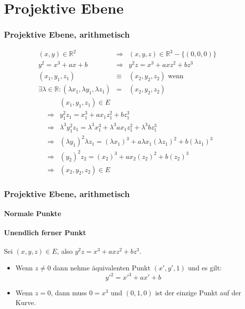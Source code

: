 \documentclass{beamer}
\begin{document}
\section{Projektive Ebene}
\begin{frame}
  \frametitle{Projektive Ebene, arithmetisch}
  \begin{eqnarray*}
    (x,y) \in \mathbb{R}^2
    & \Rightarrow & (x, y, z) \in \mathbb{R}^3 - \{(0,0,0)\} \\
    y^2 = x^3 + ax + b
    & \Rightarrow & y^2z = x^3 + axz^2 + bz^3 \\
    (x_1, y_1, z_1) &\equiv &(x_2, y_2, z_2) \text{ wenn } \\
    \exists \lambda \in \mathbb{R}:
    (\lambda x_1, \lambda y_1, \lambda z_1) & = & (x_2, y_2, z_2)
  \end{eqnarray*}
  \begin{eqnarray*}
     & & (x_1, y_1, z_1) \in E \\
     & \Rightarrow &
    y_1^2 z_1 = x_1^3 + a x_1 z_1^2 + b z_1^3 \\
    & \Rightarrow &
    \lambda^3 y_1^2 z_1
    = \lambda^3 x_1^3 + \lambda^3 a x_1 z_1^2 + \lambda^3 b z_1^3 \\
    & \Rightarrow &
    (\lambda y_1)^2 \lambda z_1 = (\lambda x_1)^3
    + a \lambda x_1 (\lambda z_1)^2 + b (\lambda z_1)^3 \\
    & \Rightarrow &
    (y_2)^2 z_2 = (x_2)^3
    + a x_2 (z_2)^2 + b (z_2)^3 \\
    & \Rightarrow & (x_2, y_2, z_2) \in E
  \end{eqnarray*}
\end{frame}
\begin{frame}
  \frametitle{Projektive Ebene, arithmetisch}
  \framesubtitle<1>{Normale Punkte}
  \framesubtitle<2>{Unendlich ferner Punkt}
  Sei $(x, y, z) \in E$, also $y^2z = x^3 + axz^2 + bz^3$.
  \begin{itemize}
  \item<1-> Wenn $z \ne 0$ dann nehme äquivalenten
    Punkt $(x', y', 1)$ und es gilt:
  \begin{equation*}
    {y'}^2 = {x'}^3 + ax' + b
  \end{equation*}
  \item<2> Wenn $z = 0$, dann muss $0 = x^3$ und $(0, 1, 0)$ ist der einzige
    Punkt auf der Kurve.
  \end{itemize}
\end{frame}
\end{document}
